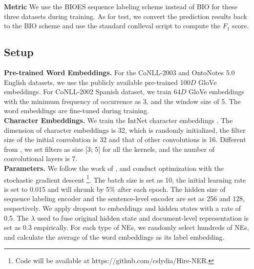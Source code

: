 \documentclass[letterpaper]{article} \usepackage{aaai20}  \usepackage{times}  \usepackage{helvet} \usepackage{courier}  \usepackage[hyphens]{url}  \usepackage{graphicx} \urlstyle{rm} \def\UrlFont{\rm}  \usepackage{graphicx}  \frenchspacing  \setlength{\pdfpagewidth}{8.5in}  \setlength{\pdfpageheight}{11in}
\begin{document}
\noindent\textbf{Metric}  We use the BIOES sequence labeling
scheme instead of BIO for these three datasets during training. As for test, we convert the prediction results back to the
BIO scheme and use the standard conlleval script to compute the $F_1$ score.

\subsection{Setup} 
\textbf{Pre-trained Word Embeddings.} For the CoNLL-2003 and OntoNotes 5.0 English datasets, we use the publicly available pre-trained 100$D$ GloVe \cite{pennington2014glove} embeddings. For CoNLL-2002 Spanish dataset, we train 64$D$ GloVe embeddings with the minimum frequency of occurrence as 3, and the window size of 5. The word embeddings are fine-tuned during training.\\
\textbf{Character Embeddings.} We train the IntNet character embeddings \cite{xin2018learning}. The dimension of character embeddings is 32, which is randomly initialized, the filter size of the initial convolution is 32 and that of other convolutions is 16. Different from \cite{xin2018learning}, we set filters as size [3; 5] for all the kernels, and the number of convolutional layers is 7.
\\
\textbf{Parameters.}  We follow the work of \cite{yang2018ncrf}, and conduct optimization with the stochastic gradient descent \footnote{Code will be available at https://github.com/cslydia/Hire-NER.}. The batch size is set as 10, the initial learning rate is set to 0.015 and will shrunk by 5\% after each epoch. The hidden size of sequence labeling encoder and the sentence-level encoder are set as 256 and 128, respectively. We apply dropout 
to embeddings and hidden states with a rate of 0.5. The $\lambda$ used to fuse original hidden state and document-level representation is set as 0.3 empirically. 
For each type of NEs, we randomly select hundreds of NEs, and calculate the average of the word embeddings as its label embedding. 

\begin{table}[t!] 
\centering
{}
\caption{$F_1$ scores on CoNLL-2002.}
\label{02result}
\end{table} 
\end{document}
